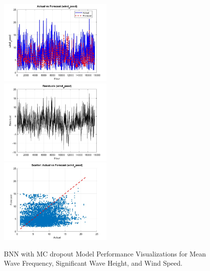 \begin{figure}
    \includegraphics[width=0.5\textwidth]{"graphs/bnn with mcd/wind speed/actual vs forecast.jpg"}\hfill
    \includegraphics[width=0.5\textwidth]{"graphs/bnn with mcd/wind speed/residuals.jpg"}\\[1ex]
    \centering
    \includegraphics[width=0.5\textwidth]{"graphs/bnn with mcd/wind speed/scatter plot.jpg"}    
    \caption{BNN with MC dropout Model Performance Visualizations for Mean Wave Frequency, Significant Wave Height, and Wind Speed.}
    \label{fig:bnn_mcd_all}
\end{figure}

